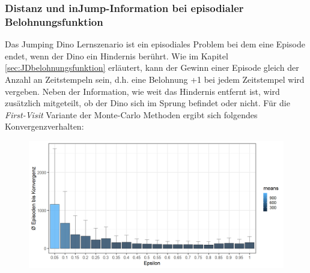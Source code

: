 \subsubsection*{Distanz und \glqq inJump\grqq{}-Information bei episodialer Belohnungsfunktion}
Das Jumping Dino Lernszenario ist ein episodiales Problem bei dem eine Episode endet, wenn der Dino ein Hindernis berührt. Wie im Kapitel \ref{sec:JDbelohnungsfunktion} erläutert, kann der Gewinn einer Episode gleich der Anzahl an Zeitstempeln sein, d.h. eine Belohnung +1 bei jedem Zeitstempel wird vergeben. Neben der Information, wie weit das Hindernis entfernt ist, wird zusätzlich mitgeteilt, ob der Dino sich im Sprung befindet oder nicht. Für die \textit{First-Visit} Variante der Monte-Carlo Methoden ergibt sich folgendes Konvergenzverhalten:

\begin{figure}[H]
    \centering
    \includegraphics[width=\textwidth]{images/SimpleZ2B1MonteCarloA}
    \label{fig:test1}
\end{figure}

